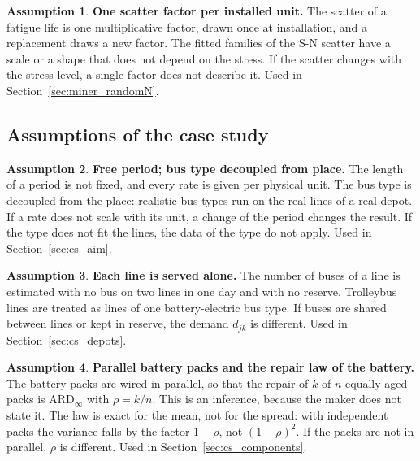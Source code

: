 \documentclass[11pt,a4paper]{article}
\theoremstyle{plain}
\theoremstyle{definition}
\newtheorem{assumption}{Assumption}
\theoremstyle{remark}
\begin{document}
\begin{assumption}\label{as:unit_scatter}
\textbf{One scatter factor per installed unit.}
The scatter of a fatigue life is one multiplicative factor, drawn once at installation, and a replacement draws a new factor.
The fitted families of the S-N scatter have a scale or a shape that does not depend on the stress.
If the scatter changes with the stress level, a single factor does not describe it.
Used in Section~\ref{sec:miner_randomN}.
\end{assumption}

\subsection{Assumptions of the case study}

\begin{assumption}\label{as:period_place}
\textbf{Free period; bus type decoupled from place.}
The length of a period is not fixed, and every rate is given per physical unit.
The bus type is decoupled from the place: realistic bus types run on the real lines of a real depot.
If a rate does not scale with its unit, a change of the period changes the result.
If the type does not fit the lines, the data of the type do not apply.
Used in Section~\ref{sec:cs_aim}.
\end{assumption}

\begin{assumption}\label{as:lines_alone}
\textbf{Each line is served alone.}
The number of buses of a line is estimated with no bus on two lines in one day and with no reserve.
Trolleybus lines are treated as lines of one battery-electric bus type.
If buses are shared between lines or kept in reserve, the demand $d_{jk}$ is different.
Used in Section~\ref{sec:cs_depots}.
\end{assumption}

\begin{assumption}\label{as:battery_law}
\textbf{Parallel battery packs and the repair law of the battery.}
The battery packs are wired in parallel, so that the repair of $k$ of $n$ equally aged packs is $\text{ARD}_\infty$ with $\rho = k/n$.
This is an inference, because the maker does not state it.
The law is exact for the mean, not for the spread: with independent packs the variance falls by the factor $1-\rho$, not $(1-\rho)^2$.
If the packs are not in parallel, $\rho$ is different.
Used in Section~\ref{sec:cs_components}.
\end{assumption}
\end{document}
